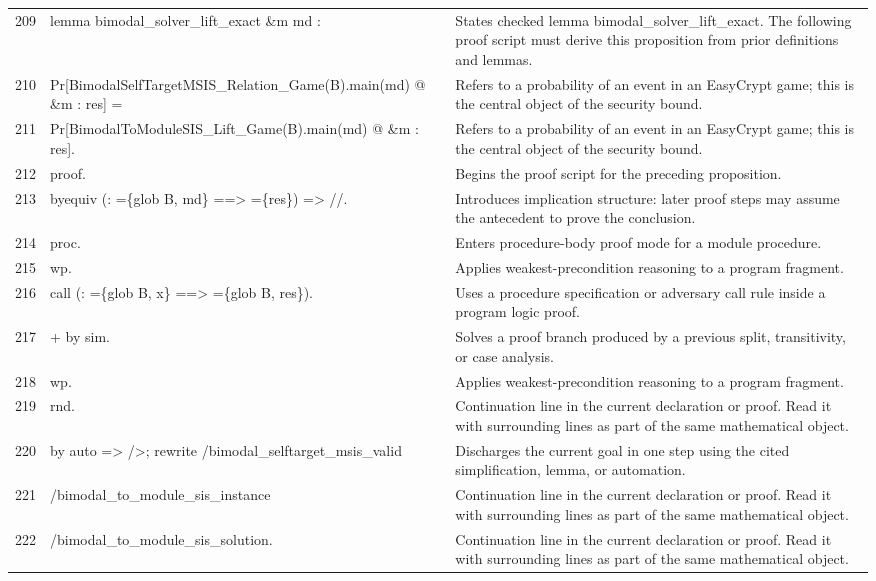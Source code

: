 \documentclass[10pt]{article}
\begin{document}
\begin{longtable}{r L{0.53\textwidth} L{0.37\textwidth}}
209 & {\ttfamily\scriptsize lemma bimodal\_solver\_lift\_exact \&m md :} & States checked lemma bimodal\_solver\_lift\_exact.  The following proof script must derive this proposition from prior definitions and lemmas. \\
210 & {\ttfamily\scriptsize   Pr[BimodalSelfTargetMSIS\_Relation\_Game(B).main(md) @ \&m : res] =} & Refers to a probability of an event in an EasyCrypt game; this is the central object of the security bound. \\
211 & {\ttfamily\scriptsize   Pr[BimodalToModuleSIS\_Lift\_Game(B).main(md) @ \&m : res].} & Refers to a probability of an event in an EasyCrypt game; this is the central object of the security bound. \\
212 & {\ttfamily\scriptsize proof.} & Begins the proof script for the preceding proposition. \\
213 & {\ttfamily\scriptsize byequiv (: =\{glob B, md\} ==> =\{res\}) => //.} & Introduces implication structure: later proof steps may assume the antecedent to prove the conclusion. \\
214 & {\ttfamily\scriptsize proc.} & Enters procedure-body proof mode for a module procedure. \\
215 & {\ttfamily\scriptsize wp.} & Applies weakest-precondition reasoning to a program fragment. \\
216 & {\ttfamily\scriptsize call (: =\{glob B, x\} ==> =\{glob B, res\}).} & Uses a procedure specification or adversary call rule inside a program logic proof. \\
217 & {\ttfamily\scriptsize + by sim.} & Solves a proof branch produced by a previous split, transitivity, or case analysis. \\
218 & {\ttfamily\scriptsize wp.} & Applies weakest-precondition reasoning to a program fragment. \\
219 & {\ttfamily\scriptsize rnd.} & Continuation line in the current declaration or proof.  Read it with surrounding lines as part of the same mathematical object. \\
220 & {\ttfamily\scriptsize by auto => />; rewrite /bimodal\_selftarget\_msis\_valid} & Discharges the current goal in one step using the cited simplification, lemma, or automation. \\
221 & {\ttfamily\scriptsize                   /bimodal\_to\_module\_sis\_instance} & Continuation line in the current declaration or proof.  Read it with surrounding lines as part of the same mathematical object. \\
222 & {\ttfamily\scriptsize                   /bimodal\_to\_module\_sis\_solution.} & Continuation line in the current declaration or proof.  Read it with surrounding lines as part of the same mathematical object. \\

\end{longtable}
\end{document}

